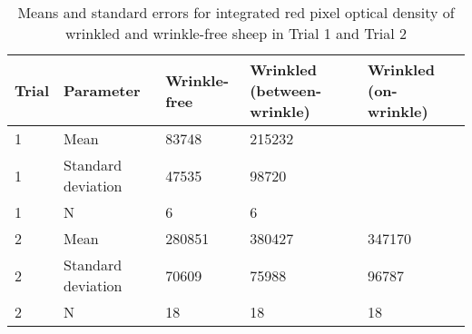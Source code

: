 %

\begin{table}[htp]
\centering
\caption{Means and standard errors for integrated red pixel optical density of wrinkled and wrinkle-free sheep in Trial 1 and Trial 2}
\label{tab:redpixelodmeans}
\vspace{0.1in}
\begin{tabular}{|p{0.4in}|p{0.6in}|p{0.9in}|p{0.9in}|p{0.9in}|}  \hline
     Trial & Parameter &  Wrinkle-free  &  Wrinkled (between-wrinkle) & Wrinkled (on-wrinkle)  \\ 
\hline
  1  & Mean &   83748        &   215232   &       \\
  1  & Standard deviation &   47535      &    98720   &  \\ 
  1  & N                  &       6      &        6   &   \\ \hline
  2  & Mean &   280851       &   380427    &  347170   \\ 
  2  & Standard deviation &    70609     &  75988  &  96787 \\ 
  2  & N                  &       18     &     18  &     18  \\ \hline
\end{tabular}
\end{table}

%
